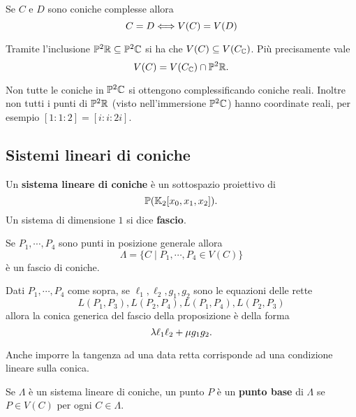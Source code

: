 \begin{multicols*}{2}
    \begin{remark}
    Se $C$ e $D$ sono coniche complesse allora
    \[C=D\Longleftrightarrow V(C)=V(D)\]
    \end{remark}

    \begin{remark}
    Tramite l'inclusione $\mathbb{P}^2\mathbb{R}\subseteq \mathbb{P}^2\mathbb{C}$ si ha che $V(C)\subseteq V(C_{\mathbb{C}})$. Pi\`u precisamente vale
    \[V(C)=V(C_{\mathbb{C}})\cap \mathbb{P}^2\mathbb{R}.\]
    \end{remark}

    \begin{remark}
    Non tutte le coniche in $\mathbb{P}^2\mathbb{C}$ si ottengono complessificando coniche reali. Inoltre non tutti i punti di $\mathbb{P}^2\mathbb{R}$ (visto nell'immersione $\mathbb{P}^2\mathbb{C}$) hanno coordinate reali, per esempio $[1:1:2]=[i:i:2i]$.
    \end{remark}


    \subsection{Sistemi lineari di coniche}

    \begin{definition}
    Un \textbf{sistema lineare di coniche} \`e un sottospazio proiettivo di
    \[\mathbb{P}(\mathbb{K}_2[x_0,x_1,x_2]).\]
    Un sistema di dimensione $1$ si dice \textbf{fascio}.
    \end{definition}

    \begin{proposition}
    Se $P_1,\cdots, P_4$ sono punti in posizione generale allora
    \[\Lambda=\{C\mid P_1,\cdots, P_4\in V(C)\}\]
    \`e un fascio di coniche.
    \end{proposition}

    \begin{corollary}
    Dati $P_1,\cdots,P_4$ come sopra, se $\ell_1,\ell_2,g_1,g_2$ sono le equazioni delle rette \[L(P_1,P_3),L(P_2,P_4),L(P_1,P_4),L(P_2,P_3)\] allora la conica generica del fascio della proposizione \`e della forma
    \[\lambda\ell_1\ell_2+\mu g_1g_2.\]
    \end{corollary}

    \begin{remark}
    Anche imporre la tangenza ad una data retta corrisponde ad una condizione lineare sulla conica.
    \end{remark}

    \begin{definition}
    Se $\Lambda$ \`e un sistema lineare di coniche, un punto $P$ \`e un \textbf{punto base} di $\Lambda$ se $P\in V(C)$ per ogni $C\in\Lambda$.
    \end{definition}


\end{multicols*}
